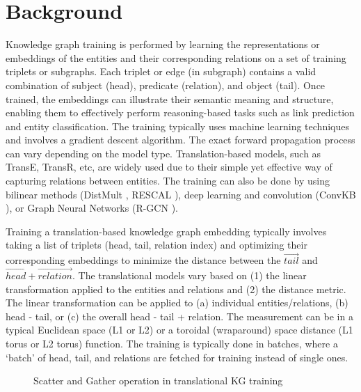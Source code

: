 \section{Background}
Knowledge graph training is performed by learning the representations or embeddings of the entities and their corresponding relations on a set of training triplets or subgraphs. Each triplet or edge (in subgraph) contains a valid combination of subject (head), predicate (relation), and object (tail). Once trained, the embeddings can illustrate their semantic meaning and structure, enabling them to effectively perform reasoning-based tasks such as link prediction and entity classification. The training typically uses machine learning techniques and involves a gradient descent algorithm. The exact forward propagation process can vary depending on the model type. Translation-based models, such as TransE, TransR, etc, are widely used due to their simple yet effective way of capturing relations between entities. The training can also be done by using bilinear methods (DistMult \cite{yang2014embedding}, RESCAL \cite{nickel2011three}), deep learning and convolution (ConvKB \cite{nguyen2017novel}), or Graph Neural Networks (R-GCN \cite{schlichtkrull2018modeling}).

Training a translation-based knowledge graph embedding typically involves taking a list of triplets (head, tail, relation index) and optimizing their corresponding embeddings to minimize the distance between the $\Vec{tail}$ and $\Vec{head} + \Vec{relation}$. The translational models vary based on (1) the linear transformation applied to the entities and relations and (2) the distance metric. The linear transformation can be applied to (a) individual entities/relations, (b) head - tail, or (c) the overall head - tail + relation. The measurement can be in a typical Euclidean space (L1 or L2) or a toroidal (wraparound) space distance (L1 torus or L2 torus) function. The training is typically done in batches, where a `batch' of head, tail, and relations are fetched for training instead of single ones.

\begin{figure}[h]
\centering     %
{}
\hspace{5pt}
\caption{Scatter and Gather operation in translational KG training}
\end{figure}

